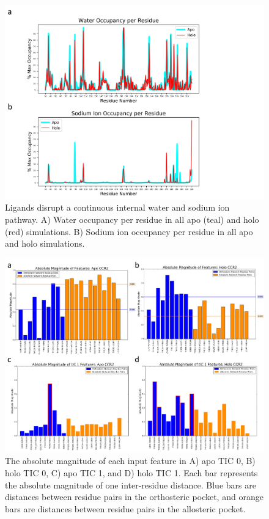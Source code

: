 \documentclass[9pt,twoside]{pnas-new}
\begin{document}
\begin{figure}
\centering
\includegraphics[width=\textwidth]{./figures/water_na_plots.png}
\caption{Ligands disrupt a continuous internal water and sodium ion pathway. A) Water occupancy per residue in all apo (teal) and holo (red) simulations. B) Sodium ion occupancy per residue in all apo and holo simulations.}
\label{fig:water_na_plots}
\end{figure}



\begin{figure}
  \begin{center}
  \includegraphics[width=\textwidth]{./figures/tic0_tic1_contributions.png}
\caption{The absolute magnitude of each input feature in A) apo TIC 0, B) holo TIC 0, C) apo TIC 1, and D) holo TIC 1. Each bar represents the absolute magnitude of one inter-residue distance. Blue bars are distances between residue pairs in the orthosteric pocket, and orange bars are distances between residue pairs in the allosteric pocket.}
\label{fig:tic0_contributions}
  \end{center}
\end{figure}
\end{document}
